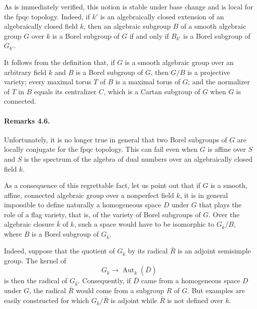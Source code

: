 As is immediately verified, this notion is stable under base change
and is local for the fpqc topology. Indeed, if \(k'\) is an
algebraically closed extension of an algebraically closed field
\(k\), then an algebraic subgroup \(B\) of a smooth algebraic group
\(G\) over \(k\) is a Borel subgroup of \(G\) if and only if
\(B_{k'}\) is a Borel subgroup of \(G_{k'}\).

It follows from the definition that, if \(G\) is a smooth algebraic
group over an arbitrary field \(k\) and \(B\) is a Borel subgroup
of \(G\), then \(G/B\) is a projective variety; every maximal torus
\(T\) of \(B\) is a maximal torus of \(G\); and the normalizer of
\(T\) in \(B\) equals its centralizer \(C\), which is a Cartan
subgroup of \(G\) when \(G\) is connected.



\paragraph{\textbf{Remarks 4.6.}}
Unfortunately, it is no longer true in general that two Borel
subgroups of \(G\) are locally conjugate for the fpqc topology.
This can fail even when \(G\) is affine over \(S\) and \(S\) is
the spectrum of the algebra of dual numbers over an algebraically
closed field \(k\).

As a consequence of this regrettable fact, let us point out that
if \(G\) is a smooth, affine, connected algebraic group over a
nonperfect field \(k\), it is in general impossible to define
naturally a homogeneous space \(D\) under \(G\) that plays the
role of a flag variety, that is, of the variety of Borel subgroups
of \(G\). Over the algebraic closure \(\bar k\) of \(k\), such a
space would have to be isomorphic to \(G_{\bar k}/B\), where \(B\)
is a Borel subgroup of \(G_{\bar k}\).

Indeed, suppose that the quotient of \(G_{\bar k}\) by its radical
\(\bar R\) is an adjoint semisimple group. The kernel of
\[
  G_{\bar k}\longrightarrow
  \operatorname{Aut}_{\bar k}(\bar D)
\]
is then the radical of \(G_{\bar k}\). Consequently, if \(\bar D\)
came from a homogeneous space \(D\) under \(G\), the radical
\(\bar R\) would come from a subgroup \(R\) of \(G\). But examples
are easily constructed for which \(G_{\bar k}/\bar R\) is adjoint
while \(\bar R\) is not defined over \(k\).

